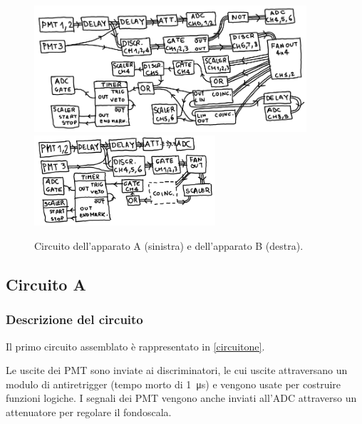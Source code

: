 \begin{figure}[h]
	\hspace{-0.25\textwidth}
	\includegraphics[width=0.9\textwidth]{immagini/circuitone}~
	\includegraphics[width=0.6\textwidth]{immagini/circuitob}
	\caption{Circuito dell'apparato A (sinistra) e dell'apparato B (destra).}
	\label{circuitone}
\end{figure}

\subsection{Circuito A}

\subsubsection{Descrizione del circuito}

Il primo circuito assemblato è rappresentato in \autoref{circuitone}.

Le uscite dei PMT sono inviate ai discriminatori, le cui uscite attraversano un modulo di antiretrigger (tempo morto di \SI{1}{\micro s}) e vengono usate per costruire funzioni logiche. I segnali dei PMT vengono anche inviati all'ADC attraverso un attenuatore per regolare il fondoscala.

